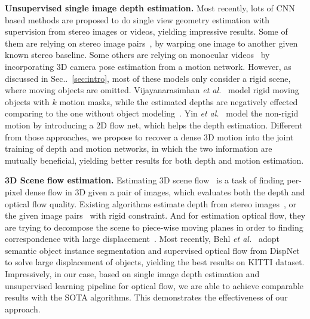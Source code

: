 \documentclass[runningheads]{llncs}
\makeatletter
\newcommand{\secref}[1]{Sec\onedot~\ref{#1}}
\DeclareRobustCommand\onedot{\futurelet\@let@token\@onedot}
\def\onedot{\ifx\@let@token.\else.\null\fi\xspace}
\def\etal{\emph{et al.}}
\makeatother
\begin{document}
\noindent\textbf{Unsupervised single image depth estimation.}
Most recently, lots of CNN based methods are proposed to do single view geometry estimation with supervision from stereo images or videos, yielding impressive results. 
Some of them are relying on stereo image pairs~\cite{xie2016deep3d,GargBR16,godard2016unsupervised}, by warping one image to another given known stereo baseline. 
Some others are relying on monocular videos~\cite{zhou2017unsupervised,wang2017learning,li2017undeepvo,yang2018aaai,mahjourian2018unsupervised,yin2018geonet,yang2018cvpr} by incorporating 3D camera pose estimation from a motion network. However, as discussed in \secref{sec:intro}, most of these models only consider a rigid scene, where moving objects are omitted. 
Vijayanarasimhan \etal~\cite{Vijayanarasimhan17} model rigid moving objects with $k$ motion masks, while the estimated depths are negatively effected comparing to the one without object modeling~\cite{zhou2017unsupervised}. Yin \etal~\cite{yin2018geonet} model the non-rigid motion by introducing a 2D flow net, which helps the depth estimation. Different from those approaches, we propose to recover a dense 3D motion into the joint training of depth and motion networks, in which the two information are mutually beneficial, yielding better results for both depth and motion estimation. 






\noindent\textbf{3D Scene flow estimation.}
Estimating 3D scene flow~\cite{vedula2005three} is a task of finding per-pixel dense flow in 3D given a pair of images, which evaluates both the depth and optical flow quality. Existing algorithms estimate depth from stereo images~\cite{menze2015cvpr,behl2017bounding}, or the given image pairs~\cite{kumar2017monocular} with rigid constraint. And for estimation optical flow, they are trying to decompose the scene to piece-wise moving planes in order to finding correspondence with large displacement~\cite{vogel2013piecewise,lv2016continuous}.
Most recently, Behl \etal~\cite{behl2017bounding} adopt semantic object instance segmentation and supervised optical flow from DispNet~\cite{mayer2016large} to solve large displacement of objects, yielding the best results on KITTI dataset. 
Impressively, in our case, based on single image depth estimation and unsupervised learning pipeline for optical flow, we are able to achieve comparable results with the SOTA algorithms. This demonstrates the effectiveness of our approach.
\end{document}
